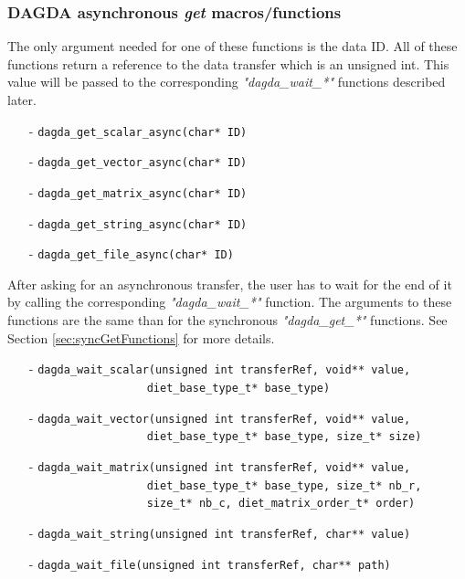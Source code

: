 \subsubsection{DAGDA asynchronous \textit{get} macros/functions}
The only argument needed for one of these functions is the data ID.
All of these functions return a reference to the data transfer which is an
unsigned int. This value will be passed to the corresponding
\textit{"dagda\_wait\_*"} functions described later.
\begin{itemize}
\item[-] \verb#dagda_get_scalar_async(char* ID)#
\item[-] \verb#dagda_get_vector_async(char* ID)#
\item[-] \verb#dagda_get_matrix_async(char* ID)#
\item[-] \verb#dagda_get_string_async(char* ID)#
\item[-] \verb#dagda_get_file_async(char* ID)#
\end{itemize}

After asking for an asynchronous transfer, the user has to wait for the end
of it by calling the corresponding \textit{"dagda\_wait\_*"} function.
The arguments to these functions are the same than for the synchronous
\textit{"dagda\_get\_*"} functions. See Section \ref{sec:syncGetFunctions}
for more details.

\begin{itemize}
\item[-] \verb#dagda_wait_scalar(unsigned int transferRef, void** value,#\\
         \verb#                  diet_base_type_t* base_type)#
\item[-] \verb#dagda_wait_vector(unsigned int transferRef, void** value,#\\
         \verb#                  diet_base_type_t* base_type, size_t* size)#
\item[-] \verb#dagda_wait_matrix(unsigned int transferRef, void** value,#\\
         \verb#                  diet_base_type_t* base_type, size_t* nb_r,#\\
         \verb#                  size_t* nb_c, diet_matrix_order_t* order)#
\item[-] \verb#dagda_wait_string(unsigned int transferRef, char** value)#
\item[-] \verb#dagda_wait_file(unsigned int transferRef, char** path)#
\end{itemize}

